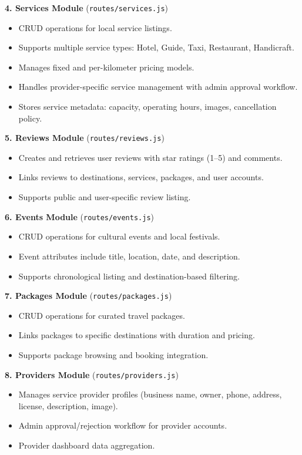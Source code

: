 \textbf{4. Services Module} (\texttt{routes/services.js})
\begin{itemize}[leftmargin=2em]
    \item CRUD operations for local service listings.
    \item Supports multiple service types: Hotel, Guide, Taxi, Restaurant, Handicraft.
    \item Manages fixed and per-kilometer pricing models.
    \item Handles provider-specific service management with admin approval workflow.
    \item Stores service metadata: capacity, operating hours, images, cancellation policy.
\end{itemize}

\textbf{5. Reviews Module} (\texttt{routes/reviews.js})
\begin{itemize}[leftmargin=2em]
    \item Creates and retrieves user reviews with star ratings (1--5) and comments.
    \item Links reviews to destinations, services, packages, and user accounts.
    \item Supports public and user-specific review listing.
\end{itemize}

\textbf{6. Events Module} (\texttt{routes/events.js})
\begin{itemize}[leftmargin=2em]
    \item CRUD operations for cultural events and local festivals.
    \item Event attributes include title, location, date, and description.
    \item Supports chronological listing and destination-based filtering.
\end{itemize}

\textbf{7. Packages Module} (\texttt{routes/packages.js})
\begin{itemize}[leftmargin=2em]
    \item CRUD operations for curated travel packages.
    \item Links packages to specific destinations with duration and pricing.
    \item Supports package browsing and booking integration.
\end{itemize}

\textbf{8. Providers Module} (\texttt{routes/providers.js})
\begin{itemize}[leftmargin=2em]
    \item Manages service provider profiles (business name, owner, phone, address, license, description, image).
    \item Admin approval/rejection workflow for provider accounts.
    \item Provider dashboard data aggregation.
\end{itemize}

